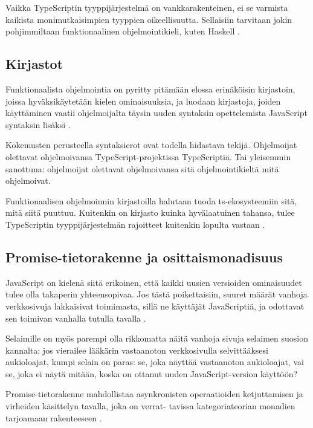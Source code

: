 Vaikka TypeScriptin tyyppijärjestelmä on vankkarakenteinen, ei se varmista kaikista monimutkaisimpien tyyppien oikeellisuutta. Sellaisiin tarvitaan jokin pohjimmiltaan funktionaalinen ohjelmointikieli, kuten Haskell \cite{holvikari2021category}.

\subsection{Kirjastot}

Funktionaalista ohjelmointia on pyritty pitämään elossa erinäköisin kirjastoin, joissa hyväksikäytetään kielen ominaisuuksia, ja luodaan kirjastoja, joiden käyttäminen vaatii ohjelmoijalta täysin uuden syntaksin opettelemista JavaScript syntaksin lisäksi \cite{ramda,sanctuary,crocks,fpts}.

Kokemusten perusteella syntaksierot ovat todella hidastava tekijä. Ohjelmoijat olettavat ohjelmoivansa TypeScript-projektissa TypeScriptiä. Tai yleisemmin sanottuna: ohjelmoijat olettavat ohjelmoivansa sitä ohjelmointikieltä mitä ohjelmoivat.

Funktionaalisen ohjelmoinnin kirjastoilla halutaan tuoda \gls{ts}-ekosysteemiin sitä, mitä siitä puuttuu. Kuitenkin on kirjasto kuinka hyvälaatuinen tahansa, tulee TypeScriptin tyyppijärjestelmän rajoitteet kuitenkin lopulta vastaan \cite{holvikari2021category}.



\subsection{Promise-tietorakenne ja osittaismonadisuus}

JavaScript on kielenä siitä erikoinen, että kaikki uusien versioiden ominaisuudet tulee olla takaperin yhteensopivaa. Jos tästä poikettaisiin, suuret määrät vanhoja verkkosivuja lakkaisivat toimimasta, sillä ne käyttäjät JavaScriptiä, ja odottavat sen toimivan vanhalla tutulla tavalla \cite{prototype_library_trends}.

Selaimille on myös parempi olla rikkomatta näitä vanhoja sivuja selaimen suosion kannalta: jos vierailee lääkärin vastaanoton verkkosivulla selvittääksesi aukioloajat, kumpi selain on paras: se, joka näyttää vastaanoton aukioloajat, vai se, joka ei näytä mitään, koska on ottanut uuden JavaScript-version käyttöön? \citep{against_self_closing_tags,proposal-joint-iteration}

Promise-tietorakenne mahdollistaa asynkronisten operaatioiden ketjuttamisen ja virheiden käsittelyn tavalla, joka on verrat-
tavissa kategoriateorian monadien tarjoamaan rakenteeseen \cite{promises-spec-94,stackoverflow:why_monad}.

